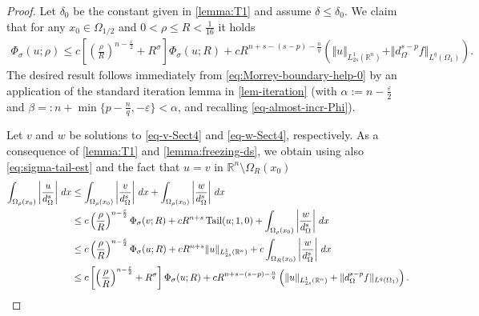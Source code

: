 \documentclass[11pt,reqno]{amsart}
\theoremstyle{plain}
\theoremstyle{definition}
\numberwithin{equation}{section}
\newcommand{\R}{\mathbb{R}}
\newcommand{\eps}{\varepsilon}
\newcommand{\1}{\mathbbm{1}}
\DeclareMathOperator{\tail}{Tail}
\renewcommand{\d}{\textnormal{\,d}}
\begin{document}
\begin{proof}
Let $\delta_0$ be the constant given in \autoref{lemma:T1} and assume $\delta \leq \delta_0$.
We claim that for any $x_0 \in \Omega_{1/2}$ and $0 < \rho \leq R < \frac{1}{16}$ it holds
\begin{align}
\label{eq:Morrey-boundary-help-0}
\Phi_\sigma(u; \rho) \le c \left[ \left( \frac{\rho}{R} \right)^{n-\frac{\eps}{2}} + R^{\sigma} \right] \Phi_\sigma(u; R) + c R^{n+s - (s-p) -\frac{n}{q}} \left( \Vert u \Vert_{L^1_{2s}(\R^n)} + \Vert d_{\Omega}^{s-p} f \Vert_{L^q(\Omega_1)} \right).
\end{align}
The desired result follows immediately from \eqref{eq:Morrey-boundary-help-0} by an application of the standard iteration lemma in \autoref{lem-iteration} (with $\alpha:=n-\frac{\varepsilon}{2}$ and $\beta=:n+\min\{p-\frac{n}{q}, -\varepsilon\}<\alpha$, and recalling \eqref{eq-almost-incr-Phi}).

Let $v$ and $w$ be solutions to \eqref{eq-v-Sect4} and \eqref{eq-w-Sect4}, respectively. As a consequence of \autoref{lemma:T1} and \autoref{lemma:freezing-ds}, we obtain using also \eqref{eq:sigma-tail-est} and the fact that $u=v$ in $\R^n \setminus \Omega_R(x_0)$
\begin{align}
\begin{split}
\label{eq:Morrey-boundary-help1}
\int_{\Omega_{\rho}(x_0)}  \left| \frac{u}{d_{\Omega}^s} \right| \d x
&\le \int_{\Omega_{\rho}(x_0)} \left| \frac{v}{d_{\Omega}^s} \right| \d x + \int_{\Omega_{\rho}(x_0)} \left| \frac{w}{d_{\Omega}^s} \right| \d x \\
&\le c \left( \frac{\rho}{R} \right)^{n-\frac{\eps}{2}} \Phi_{\sigma}(v; R) + cR^{n+s} \tail(u; 1, 0) + \int_{\Omega_{\rho}(x_0)} \left| \frac{w}{d_{\Omega}^s} \right| \d x \\
&\le c \left( \frac{\rho}{R} \right)^{n-\frac{\eps}{2}} \Phi_\sigma(u; R) + cR^{n+s} \|u\|_{L^1_{2s}(\R^n)} + c \int_{\Omega_{R}(x_0)} \left| \frac{w}{d_{\Omega}^s} \right| \d x \\
&\le c \left[ \left( \frac{\rho}{R} \right)^{n-\frac{\eps}{2}} + R^{\sigma} \right] \Phi_\sigma(u; R) + c R^{n+s - (s-p) -\frac{n}{q}} \left( \Vert u \Vert_{L^1_{2s}(\R^n)} + \Vert d_{\Omega}^{s-p} f \Vert_{L^q(\Omega_1)} \right).
\end{split}
\end{align}


\end{proof}
\end{document}
